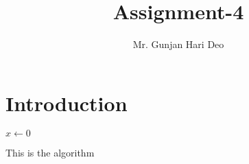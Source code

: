 \documentclass[12pt,a4paper]{article}
\author{Mr. Gunjan Hari Deo}
\title{Assignment-4}
\begin{document}
\maketitle
\section{Introduction}
 \begin{algorithm}
    $x \gets 0$\; 
    
    \caption{This is the algorithm}
  \end{algorithm}
\end{document}
